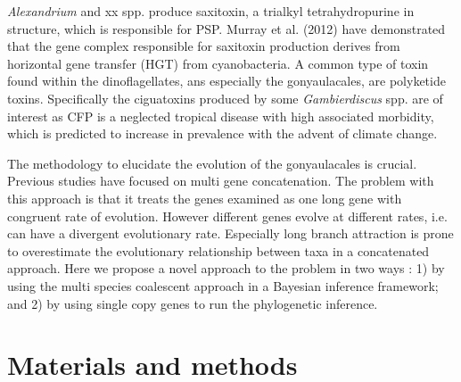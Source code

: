 \documentclass[12pt]{article}
\begin{document}
\emph{Alexandrium} and xx spp. produce saxitoxin, a trialkyl tetrahydropurine in structure, which is responsible for PSP. Murray et al. (2012) have demonstrated that the gene complex responsible for saxitoxin production derives from horizontal gene transfer (HGT) from cyanobacteria.
A common type of toxin found within the dinoflagellates, ans especially the gonyaulacales, are polyketide toxins. Specifically the ciguatoxins produced by some \emph{Gambierdiscus} spp. are of interest as CFP is a neglected tropical disease with high associated morbidity, which is predicted to increase in prevalence with the advent of climate change.





The methodology to elucidate the evolution of the gonyaulacales is crucial. Previous studies have focused on multi gene concatenation. The problem with this approach is that it treats the genes examined as one long gene with congruent rate of evolution. However different genes evolve at different rates, i.e. can have a divergent evolutionary rate. Especially long branch attraction is prone to overestimate the evolutionary relationship between taxa in a concatenated approach. Here we propose a novel approach to the problem in two ways : 1) by using the multi species coalescent approach in a Bayesian inference framework; and 2) by using single copy genes to run the phylogenetic inference.

\newpage

\section{Materials and methods}
\end{document}

